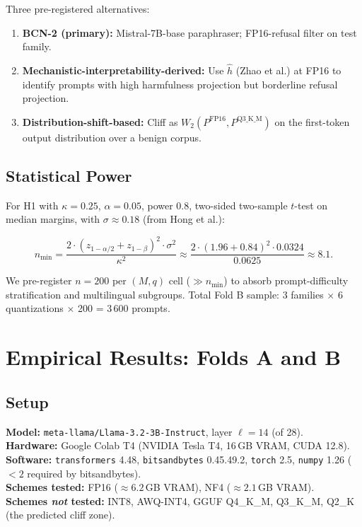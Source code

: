 \documentclass[11pt,a4paper]{article}
\newcommand{\kap}{\kappa}
\newcommand{\hhat}{\hat{h}}
\begin{document}
Three pre-registered alternatives:
\begin{enumerate}[leftmargin=2em]
  \item \textbf{BCN-2 (primary):} Mistral-7B-base paraphraser; FP16-refusal filter on test family.
  \item \textbf{Mechanistic-interpretability-derived:} Use $\hhat$ (Zhao et al.) at FP16 to
        identify prompts with high harmfulness projection but borderline refusal projection.
  \item \textbf{Distribution-shift-based:} Cliff as $W_2(P^\text{FP16}, P^{\text{Q3\_K\_M}})$
        on the first-token output distribution over a benign corpus.
\end{enumerate}

\subsection{Statistical Power}

For H1 with $\kap = 0.25$, $\alpha = 0.05$, power $0.8$, two-sided two-sample
$t$-test on median margins, with $\sigma \approx 0.18$ (from Hong et al.):

\[
n_\text{min} = \frac{2 \cdot (z_{1-\alpha/2} + z_{1-\beta})^2 \cdot \sigma^2}{\kap^2}
\approx \frac{2 \cdot (1.96 + 0.84)^2 \cdot 0.0324}{0.0625} \approx 8.1.
\]

We pre-register $n = 200$ per $(M, q)$ cell ($\gg n_\text{min}$) to absorb prompt-difficulty
stratification and multilingual subgroups.
Total Fold B sample: 3 families $\times$ 6 quantizations $\times$ 200 = 3\,600 prompts.

\section{Empirical Results: Folds A and B}
\label{sec:results}

\subsection{Setup}

\textbf{Model:} \texttt{meta-llama/Llama-3.2-3B-Instruct}, layer $\ell = 14$ (of 28).\\
\textbf{Hardware:} Google Colab T4 (NVIDIA Tesla T4, 16\,GB VRAM, CUDA 12.8).\\
\textbf{Software:} \texttt{transformers} 4.48, \texttt{bitsandbytes} 0.45.49.2,
\texttt{torch} 2.5, \texttt{numpy} 1.26 ($< 2$ required by bitsandbytes).\\
\textbf{Schemes tested:} FP16 ($\approx 6.2$\,GB VRAM), NF4 ($\approx 2.1$\,GB VRAM).\\
\textbf{Schemes \emph{not} tested:} INT8, AWQ-INT4, GGUF Q4\_K\_M, Q3\_K\_M, Q2\_K
(the predicted cliff zone).
\end{document}
